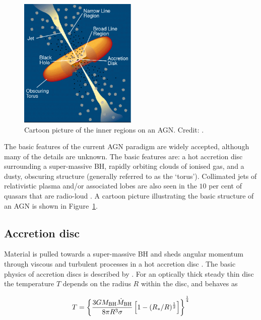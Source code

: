 \begin{figure}
  \centering
  \includegraphics[width=0.5\textwidth]{figures/chapter05/urry_model}
  \caption[{Cartoon picture of the inner regions on an AGN.}]{Cartoon picture of the inner regions on an AGN. Credit: \citet{urry95}.}
  \label{fig:agnmodel}
\end{figure}

The basic features of the current AGN paradigm are widely accepted, although many of the details are unknown.
The basic features are: a hot accretion disc surrounding a super-massive BH, rapidly orbiting clouds of ionised gas, and a dusty, obscuring structure (generally referred to as the `torus').
Collimated jets of relativistic plasma and/or associated lobes are also seen in the $10$ per cent of quasars that are radio-loud \citep[e.g.][]{peterson97}.
A cartoon picture illustrating the basic structure of an AGN is shown in Figure~\ref{fig:agnmodel}.

\subsection{Accretion disc}

Material is pulled towards a super-massive BH and sheds angular momentum through viscous and turbulent processes in a hot accretion disc \citep[e.g.][]{begelman85}.
The basic physics of accretion discs is described by \citet{pringle81}.
For an optically thick steady thin disc the temperature $T$ depends on the radius $R$ within the disc, and behaves as

\begin{eqnarray}
T = \left\{
\frac {3GM_{\text{BH}}\dot M_{\text{BH}}} {8 \pi R^3 \sigma} \left[ 1- (R_*/R)^{1\over2} \right]
\right\}^{1\over 4}
\end{eqnarray}

